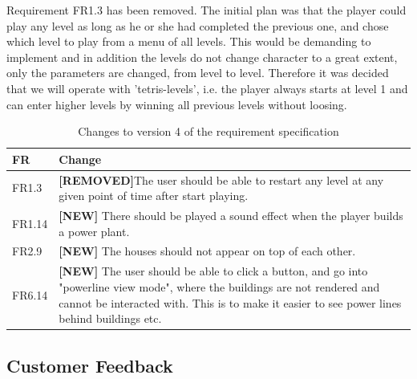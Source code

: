 	Requirement FR1.3 has been removed. The initial plan was that the player could play any level as long as he or she had completed the previous one, and chose which level to play from a menu of all levels. This would be demanding to implement and in addition the levels do not change character to a great extent, only the parameters are changed, from level to level. Therefore it was decided that we will operate with 'tetris-levels', i.e. the player always starts at level 1 and can enter higher levels by winning all previous levels without loosing. 

	\begin{table}[H]
	\begin{tabular}{| p{1.5cm} | p{12cm} |}
		\hline
		\rowcolor{lightgray}
		{\bf FR} & {\bf Change} \\ \hline
		FR1.3 & {\bf \color{red}[REMOVED]}The user should be able to restart any level at any given point of time after start playing. \\ \hline
		FR1.14 & {\bf \color{green}[NEW]} There should be played a sound effect when the player builds a power plant. \\ \hline
		FR2.9 & {\bf \color{green}[NEW]} The houses should not appear on top of each other. \\ \hline
		FR6.14 & {\bf \color{green}[NEW]} The user should be able to click a button, and go into "powerline view mode", where the buildings are not rendered and cannot be interacted with. This is to make it easier to see power lines behind buildings etc. \\ \hline
	\end{tabular}
	\caption{Changes to version 4 of the requirement specification}
	\label{table:reqspec4}
	\end{table}

\subsection{Customer Feedback}
